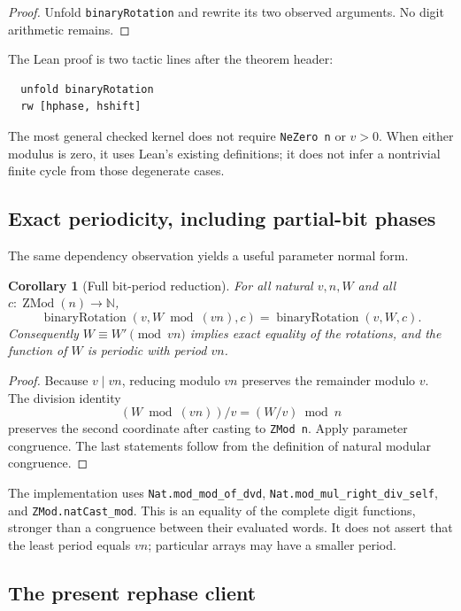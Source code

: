 \documentclass[11pt,letterpaper]{article}
\newcommand{\code}[1]{{\small\urlstyle{tt}\nolinkurl{#1}}}
\newtheorem{corollary}[proposition]{Corollary}
\begin{document}
\begin{proof}
Unfold \code{binaryRotation} and rewrite its two observed arguments. No digit arithmetic remains.
\end{proof}

The Lean proof is two tactic lines after the theorem header:
\begin{lstlisting}
  unfold binaryRotation
  rw [hphase, hshift]
\end{lstlisting}
The most general checked kernel does not require \code{NeZero n} or $v>0$. When either modulus is zero, it uses Lean's existing definitions; it does not infer a nontrivial finite cycle from those degenerate cases.

\subsection{Exact periodicity, including partial-bit phases}

The same dependency observation yields a useful parameter normal form.

\begin{corollary}[Full bit-period reduction]
For all natural $v,n,W$ and all $c:\operatorname{ZMod}(n)\to\mathbb N$,
\[
 \operatorname{binaryRotation}(v,W\bmod(vn),c)
 =\operatorname{binaryRotation}(v,W,c).
\]
Consequently $W\equiv W'\pmod{vn}$ implies exact equality of the rotations, and the function of $W$ is periodic with period $vn$.
\end{corollary}

\begin{proof}
Because $v\mid vn$, reducing modulo $vn$ preserves the remainder modulo $v$. The division identity
\[
 (W\bmod(vn))/v=(W/v)\bmod n
\]
preserves the second coordinate after casting to \code{ZMod n}. Apply parameter congruence. The last statements follow from the definition of natural modular congruence.
\end{proof}

The implementation uses \code{Nat.mod_mod_of_dvd}, \code{Nat.mod_mul_right_div_self}, and \code{ZMod.natCast_mod}. This is an equality of the complete digit functions, stronger than a congruence between their evaluated words. It does not assert that the least period equals $vn$; particular arrays may have a smaller period.

\subsection{The present rephase client}
\end{document}

